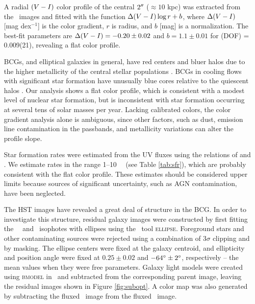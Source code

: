 \documentclass[iop]{emulateapj}
\begin{document}
A radial $(V-I)$ color profile of the central $2\rm{^\prime}\hskip -0.1em\rm{^\prime}$ ($\approx
10$ kpc) was extracted from the \hst\ images and fitted with the
function $\Delta(V-I) \log r + b$, where $\Delta(V-I)$
[mag dex$^{-1}$] is the color gradient, $r$ is radius, and $b$ [mag]
is a normalization. The best-fit parameters are $\Delta(V-I) =
-0.20 \pm 0.02$ and $b = 1.1 \pm 0.01$ for \chisq(DOF) = 0.009(21),
revealing a flat color profile.

BCGs, and elliptical galaxies in general, have red centers and bluer
halos due to the higher metallicity of the central stellar populations
\citep{1990ApJS...73..637M}. BCGs in cooling flows with significant
star formation have unusually blue cores relative to the quiescent
halos \citep[\eg][]{rafferty06}. Our analysis shows a flat color
profile, which is consistent with a modest level of nuclear star
formation, but is inconsistent with star formation occurring at
several tens of solar masses per year. Lacking calibrated colors, the
color gradient analysis alone is ambiguous, since other factors, such
as dust, emission line contamination in the passbands, and metallicity
variations can alter the profile slope.

Star formation rates were estimated from the UV fluxes using the
relations of \citet{kennicutt2} and \citet{salim2007}. We estimate
rates in the range 1--10 ~\msolpy\ (see Table \ref{tab:sfr}), which
are probably consistent with the flat color profile. These estimates
should be considered upper limits because sources of significant
uncertainty, such as AGN contamination, have been neglected.

The HST images have revealed a great deal of structure in the BCG. In
order to investigate this structure, residual galaxy images were
constructed by first fitting the \hst\ \myv\ and \myi\ isophotes with
ellipses using the \iraf\ tool {\textsc{ellipse}}. Foreground stars
and other contaminating sources were rejected using a combination of
$3\sigma$ clipping and by masking. The ellipse centers were fixed at
the galaxy centroid, and ellipticity and position angle were fixed at
$0.25 \pm 0.02$ and $-64\rm{^{\circ}} \pm 2\rm{^{\circ}}$, respectively -- the mean
values when they were free parameters. Galaxy light models were
created using {\textsc{bmodel}} in \iraf\ and subtracted from the
corresponding parent image, leaving the residual images shown in
Figure \ref{fig:subopt}. A color map was also generated by subtracting
the fluxed \myi\ image from the fluxed \myv\ image.
\end{document}

